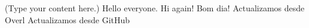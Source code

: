 \documentclass{article}
\begin{document}
(Type your content here.)
Hello everyone.
Hi again!
Bom dia!
Actualizamos desde Overl
Actualizamos desde GitHub
\end{document}
